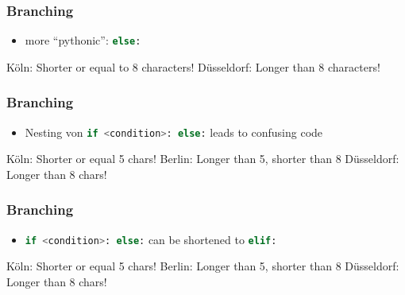 \documentclass[english]{beamer}
\newcommand{\ta}[1]{\textattachfile[color=1 0 0]{#1}{Code}}
\begin{document}
\begin{frame}[containsverbatim]
\frametitle{Branching}

\begin{itemize}
\item more \enquote{pythonic}:  \lstinline[language={Python}]{else:}
\end{itemize}



\begin{ausgabe}
Köln: Shorter or equal to 8 characters!
Düsseldorf: Longer than 8 characters!
\end{ausgabe}

\end{frame}

\begin{frame}[containsverbatim]
\frametitle{Branching}

\begin{itemize}
\item Nesting von \lstinline[language={Python}]{if <condition>: else:} leads to confusing code
\end{itemize}



\begin{ausgabe}
Köln: Shorter or equal 5 chars!
Berlin: Longer than 5, shorter than 8
Düsseldorf: Longer than 8 chars!
\end{ausgabe}

\end{frame}

\begin{frame}[containsverbatim]
\frametitle{Branching}

\begin{itemize}
\item \lstinline[language={Python}]{if <condition>: else:} can be shortened to \lstinline[language={Python}]{elif:} 
\end{itemize}



\begin{ausgabe}
Köln: Shorter or equal 5 chars!
Berlin: Longer than 5, shorter than 8
Düsseldorf: Longer than 8 chars!
\end{ausgabe}


\end{frame}
\end{document}
